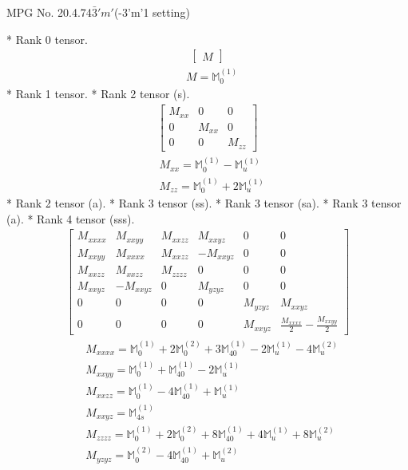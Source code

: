 \documentclass[fleqn,8pt,landscape]{jsarticle}
\begin{document}
\setcounter{MaxMatrixCols}{32}

\renewcommand{\tablename}{Table~}
\renewcommand{\figurename}{Figure~}
\begin{center}
\LARGE
MPG No. 20.4.74\quad$\bar{3}'m'$\quad(-3'm'1 setting)
\end{center}
* Rank 0 tensor.
\begin{align*}
\begin{bmatrix} M \end{bmatrix}
\end{align*}
\begin{align*}
& M = \mathbb{M}_{0}^{(1)}
\end{align*}
* Rank 1 tensor.
* Rank 2 tensor (s).
\begin{align*}
\begin{bmatrix} M_{xx} & 0 & 0 \\ 0 & M_{xx} & 0 \\ 0 & 0 & M_{zz} \end{bmatrix}
\end{align*}
\begin{align*}
& M_{xx} = \mathbb{M}_{0}^{(1)} - \mathbb{M}_{u}^{(1)} \\
& M_{zz} = \mathbb{M}_{0}^{(1)} + 2 \mathbb{M}_{u}^{(1)}
\end{align*}
* Rank 2 tensor (a).
* Rank 3 tensor (ss).
* Rank 3 tensor (sa).
* Rank 3 tensor (a).
* Rank 4 tensor (sss).
\begin{align*}
\begin{bmatrix} M_{xxxx} & M_{xxyy} & M_{xxzz} & M_{xxyz} & 0 & 0 \\ M_{xxyy} & M_{xxxx} & M_{xxzz} & - M_{xxyz} & 0 & 0 \\ M_{xxzz} & M_{xxzz} & M_{zzzz} & 0 & 0 & 0 \\ M_{xxyz} & - M_{xxyz} & 0 & M_{yzyz} & 0 & 0 \\ 0 & 0 & 0 & 0 & M_{yzyz} & M_{xxyz} \\ 0 & 0 & 0 & 0 & M_{xxyz} & \frac{M_{xxxx}}{2} - \frac{M_{xxyy}}{2} \end{bmatrix}
\end{align*}
\begin{align*}
& M_{xxxx} = \mathbb{M}_{0}^{(1)} + 2 \mathbb{M}_{0}^{(2)} + 3 \mathbb{M}_{40}^{(1)} - 2 \mathbb{M}_{u}^{(1)} - 4 \mathbb{M}_{u}^{(2)} \\
& M_{xxyy} = \mathbb{M}_{0}^{(1)} + \mathbb{M}_{40}^{(1)} - 2 \mathbb{M}_{u}^{(1)} \\
& M_{xxzz} = \mathbb{M}_{0}^{(1)} - 4 \mathbb{M}_{40}^{(1)} + \mathbb{M}_{u}^{(1)} \\
& M_{xxyz} = \mathbb{M}_{4s}^{(1)} \\
& M_{zzzz} = \mathbb{M}_{0}^{(1)} + 2 \mathbb{M}_{0}^{(2)} + 8 \mathbb{M}_{40}^{(1)} + 4 \mathbb{M}_{u}^{(1)} + 8 \mathbb{M}_{u}^{(2)} \\
& M_{yzyz} = \mathbb{M}_{0}^{(2)} - 4 \mathbb{M}_{40}^{(1)} + \mathbb{M}_{u}^{(2)}
\end{align*}
\end{document}
